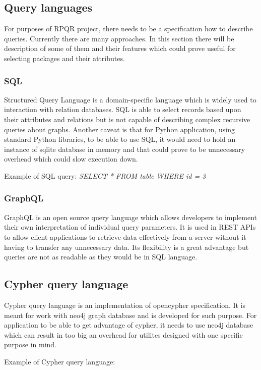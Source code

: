 \subsection*{Query languages}
For purposes of RPQR project, there needs to be a specification how to describe queries. Currently
there are many approaches. In this section there will be description of some of them and their features
which could prove useful for selecting packages and their attributes.

\subsubsection*{SQL}
Structured Query Language\cite{SQL} is a domain-specific language which is widely used to interaction with
relation databases. SQL is able to select records based upon their attributes and relations but
is not capable of describing complex recursive queries about graphs. Another caveat is that for Python
application, using standard Python libraries, to be able to use SQL, it would need to hold an instance of sqlite database in memory and
that could prove to be unnecessary overhead which could slow execution down.

Example of SQL query:
\textit{SELECT * FROM table WHERE id = 3}

\subsubsection*{GraphQL}
GraphQL\cite{GraphQL} is an open source query language which allows developers to implement their own interpretation
of individual query parameters. It is used in REST APIs to allow client applications to retrieve data
effectively from a server without it having to transfer any unnecessary data. Its flexibility is
a great advantage but queries are not as readable as they would be in SQL language.

\subsection*{Cypher query language}
Cypher query language is an implementation of opencypher specification. It is meant for work with
neo4j graph database and is developed for such purpose. For application to be able to get advantage
of cypher, it needs to use neo4j database which can result in too big an overhead for utilites
designed with one specific purpose in mind.

Example of Cypher query language:

